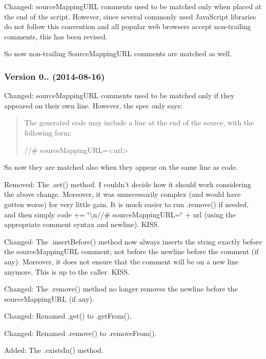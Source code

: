 
\begin{DoxyItemize}
\item Changed\+: source\+Mapping\+U\+RL comments used to be matched only when placed at the end of the script. However, since several commonly used Java\+Script libraries do not follow this convention and all popular web browsers accept non-\/trailing comments, this has been revised.

So now non-\/trailing Source\+Mapping\+U\+RL comments are matched as well.
\end{DoxyItemize}

\subsubsection*{Version 0.. (2014-\/08-\/16)}


\begin{DoxyItemize}
\item Changed\+: source\+Mapping\+U\+RL comments used to be matched only if they appeared on their own line. However, the spec only says\+:
\end{DoxyItemize}

\begin{quote}
The generated code may include a line at the end of the source, with the following form\+: \begin{DoxyVerb}//# sourceMappingURL=<url>
\end{DoxyVerb}
 \end{quote}


So now they are matched also when they appear on the same line as code.


\begin{DoxyItemize}
\item Removed\+: The {\ttfamily .set()} method. I couldn’t decide how it should work considering the above change. Moreover, it was unnecessarily complex (and would have gotten worse) for very little gain. It is much easier to run {\ttfamily .remove()} if needed, and then simply {\ttfamily code += \char`\"{}\textbackslash{}n//\# source\+Mapping\+U\+R\+L=\char`\"{} + url} (using the appropriate comment syntax and newline). K\+I\+SS.
\item Changed\+: The {\ttfamily .insert\+Before()} method now always inserts the string exactly before the source\+Mapping\+U\+RL comment; not before the newline before the comment (if any). Moreover, it does not ensure that the comment will be on a new line anymore. This is up to the caller. K\+I\+SS.
\item Changed\+: The {\ttfamily .remove()} method no longer removes the newline before the source\+Mapping\+U\+RL (if any).
\item Changed\+: Renamed {\ttfamily .get()} to {\ttfamily .get\+From()}.
\item Changed\+: Renamed {\ttfamily .remove()} to {\ttfamily .remove\+From()}.
\item Added\+: The {\ttfamily .exists\+In()} method.
\end{DoxyItemize}

